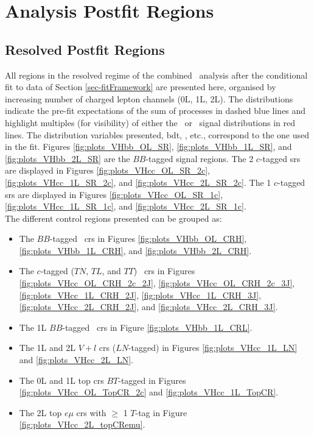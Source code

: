 \section{Analysis Postfit Regions}\label{appsec-vh-analRegPosfit}
\subsection{Resolved Postfit Regions}\label{appsec-vh-analRegResPosfit}
All regions in the resolved regime of the combined \vhbc\ analysis after the conditional fit to data of Section \ref{sec-fitFramework} are presented here, organised by increasing number of charged lepton channels (0L, 1L, 2L). The distributions indicate the pre-fit expectations of the sum of processes in dashed blue lines and highlight multiples (for visibility) of either the \vhb\ or \vhc\ signal distributions in red lines. The distribution variables presented, \gls{bdt}, \ptv, etc., correspond to the one used in the fit. Figures \ref{fig:plots_VHbb_OL_SR}, \ref{fig:plots_VHbb_1L_SR}, and \ref{fig:plots_VHbb_2L_SR} are the $BB$-tagged signal regions. The 2 $c$-tagged \glspl{sr} are displayed in Figures \ref{fig:plots_VHcc_OL_SR_2c}, \ref{fig:plots_VHcc_1L_SR_2c}, and \ref{fig:plots_VHcc_2L_SR_2c}. The 1 $c$-tagged \glspl{sr} are displayed in Figures \ref{fig:plots_VHcc_OL_SR_1c}, \ref{fig:plots_VHcc_1L_SR_1c}, and \ref{fig:plots_VHcc_2L_SR_1c}. \\

The different control regions presented can be grouped as:
\begin{itemize}
  \item The $BB$-tagged \highdr\ \glspl{cr} in Figures \ref{fig:plots_VHbb_OL_CRH}, \ref{fig:plots_VHbb_1L_CRH}, and \ref{fig:plots_VHbb_2L_CRH}.
  \item The $c$-tagged ($TN$, $TL$, and $TT$) \highdr\ \glspl{cr} in Figures \ref{fig:plots_VHcc_OL_CRH_2c_2J}, \ref{fig:plots_VHcc_OL_CRH_2c_3J}, \ref{fig:plots_VHcc_1L_CRH_2J}, \ref{fig:plots_VHcc_1L_CRH_3J}, \ref{fig:plots_VHcc_2L_CRH_2J}, and \ref{fig:plots_VHcc_2L_CRH_3J}.
  \item The 1L $BB$-tagged \lowdr\ \glspl{cr} in Figure \ref{fig:plots_VHbb_1L_CRL}.
  \item The 1L and 2L $V+l$ \glspl{cr} ($LN$-tagged) in Figures \ref{fig:plots_VHcc_1L_LN} and \ref{fig:plots_VHcc_2L_LN}.
  \item The 0L and 1L top \glspl{cr} $BT$-tagged in Figures \ref{fig:plots_VHcc_OL_TopCR_2c} and \ref{fig:plots_VHcc_1L_TopCR}.
  \item The 2L top $e\mu$ \glspl{cr} with $\geq$ 1 $T$-tag in Figure \ref{fig:plots_VHcc_2L_topCRemu}.
\end{itemize}
  

